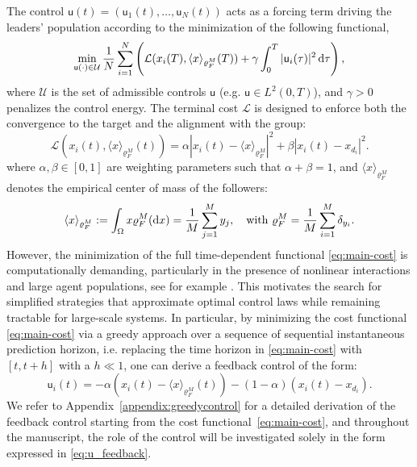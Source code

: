 \documentclass[10pt, reqno]{amsart}
\theoremstyle{definition}
\theoremstyle{remark}
\numberwithin{equation}{section}
\newcommand{\U}{\mathsf{u}}
\newcommand{\dx}{\textnormal{d}x}
\newcommand{\dtau}{\textnormal{d}\tau}
\begin{document}
The control $\U(t)=(\U_1(t),\ldots,\U_N(t))$ acts as a forcing term driving the leaders' population according to the minimization of the following functional,
\begin{equation}\label{eq:main-cost}
\min_{\U(\cdot)\in\mathcal{U}} \frac{1}{N}\sum_{i=1}^N\left(\mathcal L(x_i(T),\langle x \rangle_{\varrho_F^M}(T))+\gamma\int_0^T |\U_i(\tau)|^2\,\dtau\right),
\end{equation}
where $\mathcal U$ is the set of admissible controls $\U$ (e.g. $\U\in L^2(0,T)$), and $\gamma > 0$ penalizes the control energy.  The terminal cost $\mathcal{L}$ is designed to enforce both the convergence to the target and the alignment with the group:
\[
\mathcal L(x_i(t),\langle x \rangle_{\varrho_F^M}(t))=\alpha|x_i(t) - \langle x \rangle_{\varrho_F^M}|^2+\beta|x_i(t)-x_{d_i}|^2.
\]
where $\alpha,\beta \in [0,1]$ are weighting parameters such that $\alpha+\beta = 1$, and $\langle x \rangle_{\varrho_F^M}$ denotes the empirical center of mass of the followers:
\[%
\langle x \rangle_{\varrho_F^M} := \int_\Omega x \varrho_F^M (\dx) = \frac1M\sum_{j=1}^M y_j, \quad \mbox{with } \varrho_F^M = \frac1M \sum_{i=1}^M \delta_{y_i}.
\]%
However, the minimization of the full time-dependent functional \eqref{eq:main-cost} is computationally demanding, particularly in the presence of nonlinear interactions and large agent populations, see for example \cite{BBCK18}. This motivates the search for simplified strategies that approximate optimal control laws while remaining tractable for large-scale systems. In particular, by minimizing the cost functional \eqref{eq:main-cost} via a greedy approach over a sequence of sequential instantaneous prediction horizon, i.e. replacing the time horizon in \eqref{eq:main-cost}  with $[t,t+h]$ with a $h\ll 1$, one can derive a feedback control of the form:
\begin{equation}\label{eq:u_feedback}
 \U_i(t) = -\alpha(x_i(t) - \langle x \rangle_{\varrho_F^M}(t)) - (1-\alpha)(x_i(t)-x_{d_i}).
 \end{equation}
We refer to Appendix~\ref{appendix:greedycontrol} for a detailed derivation of the feedback control starting from the cost functional~\eqref{eq:main-cost}, and throughout the manuscript, the role of the control will be investigated solely in the form expressed in \eqref{eq:u_feedback}.
\end{document}
